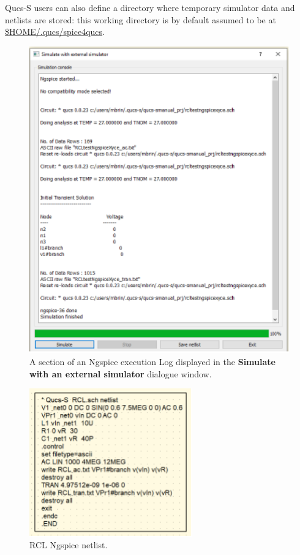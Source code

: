 \documentclass[10pt, a4paper]{report}
\begin{document}
\noindent Qucs-S users can also define a directory where temporary simulator data and netlists are stored: this working directory is by default assumed to be at \url{$HOME/.qucs/spice4qucs}.
 \begin{figure}[h]
	\centering
	\includegraphics[width=12cm]{pics/chap2/conScreen.pdf}
	\caption{ A section of an Ngspice execution Log displayed in the\textbf{ Simulate with an external simulator} dialogue window.}
	\label{Fig11}
\end{figure}
 \begin{figure}[ht]
	\centering
	\includegraphics[width=7cm]{pics/chap2/RCLnetlist.pdf}
	\caption{RCL Ngspice netlist. }
	\label{Fig12}
\end{figure}
\end{document}
